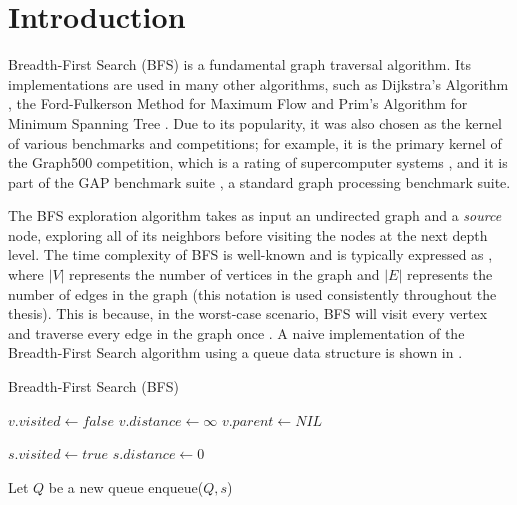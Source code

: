 \chapter{Introduction}
\label{cha:intro}

Breadth-First Search (BFS) is a fundamental graph traversal algorithm. Its implementations are used in many other algorithms, such as Dijkstra's Algorithm \cite{dijkstra2022note}, the Ford-Fulkerson Method for Maximum Flow \cite{ford1956maximal} and Prim's Algorithm for Minimum Spanning Tree \cite{prim1957shortest}. Due to its popularity, it was also chosen as the kernel of various benchmarks and competitions; for example, it is the primary kernel of the Graph500 competition, which is a rating of supercomputer systems \cite{murphy2010introducing}, and it is part of the GAP benchmark suite \cite{beamer2015gap}, a standard graph processing benchmark suite.

The BFS exploration algorithm takes as input an undirected graph and a \textit{source} node, exploring all of its neighbors before visiting the nodes at the next depth level. The time complexity of BFS is well-known and is typically expressed as , where $|V|$ represents the number of vertices in the graph and $|E|$ represents the number of edges in the graph (this notation is used consistently throughout the thesis). This is because, in the worst-case scenario, BFS will visit every vertex and traverse every edge in the graph once \cite{cormen2022introduction}. A naive implementation of the Breadth-First Search algorithm using a queue data structure is shown in .

\begin{algorithm}[!b]
    \caption{Breadth-First Search (BFS)}
    \label{alg:bfs}

    
     {
        $v.visited \gets false$\;
        $v.distance \gets \infty$\;
        $v.parent \gets NIL$\;
    }

    $s.visited \gets true$\;
    $s.distance \gets 0$\;
    
    Let $Q$ be a new queue\;
    enqueue($Q, s$)\;

\end{algorithm}

